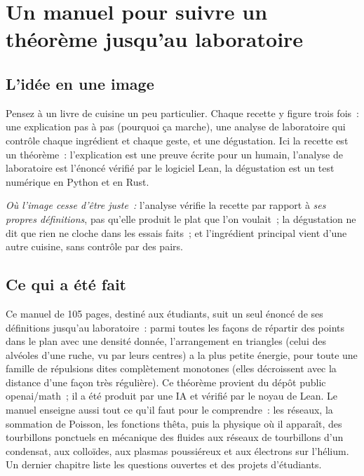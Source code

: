 \chapter[Un manuel, un théorème]{Un manuel pour suivre un théorème jusqu'au laboratoire}

\section*{L'idée en une image}

\begin{analogie}
Pensez à un livre de cuisine un peu particulier. Chaque recette y figure trois fois~: une explication pas à pas
(pourquoi ça marche), une analyse de laboratoire qui contrôle chaque ingrédient et chaque geste, et une dégustation.
Ici la \og recette\fg{} est un théorème~: l'explication est une preuve écrite pour un humain, l'analyse de
laboratoire est l'énoncé vérifié par le logiciel Lean, la dégustation est un test numérique en Python et en Rust.

\emph{Où l'image cesse d'être juste~:} l'analyse vérifie la recette par rapport à \emph{ses propres définitions},
pas qu'elle produit le plat que l'on voulait~; la dégustation ne dit que \og rien ne cloche dans les essais faits\fg~;
et l'ingrédient principal vient d'une autre cuisine, sans contrôle par des pairs.
\end{analogie}

\section*{Ce qui a été fait}

Ce manuel de 105 pages, destiné aux étudiants, suit un seul énoncé de ses définitions jusqu'au laboratoire~:
parmi toutes les façons de répartir des points dans le plan avec une densité donnée, l'arrangement en triangles
(celui des alvéoles d'une ruche, vu par leurs centres) a la plus petite énergie, pour toute une famille de
répulsions dites \og complètement monotones\fg{} (elles décroissent avec la distance d'une façon très régulière).
Ce théorème provient du dépôt public openai/math~; il a été produit par une IA et vérifié par le noyau de Lean.
Le manuel enseigne aussi tout ce qu'il faut pour le comprendre~: les
réseaux, la sommation de Poisson, les fonctions thêta, puis la physique où il apparaît, des tourbillons ponctuels
en mécanique des fluides aux réseaux de tourbillons d'un condensat, aux colloïdes, aux plasmas poussiéreux et aux
électrons sur l'hélium. Un dernier chapitre liste les questions ouvertes et des projets d'étudiants.

